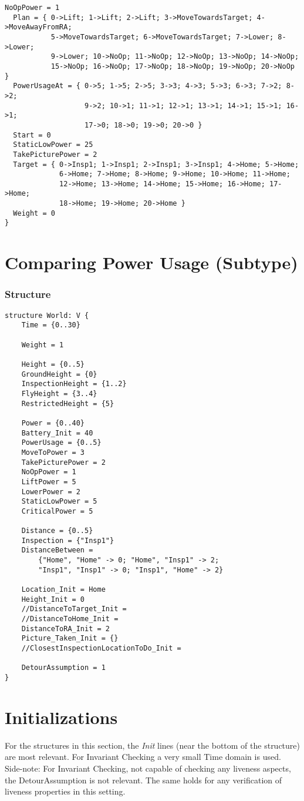 \documentclass[12pt]{extarticle}
\begin{document}
\begin{lstlisting}[basicstyle=\tiny]
  NoOpPower = 1
  Plan = { 0->Lift; 1->Lift; 2->Lift; 3->MoveTowardsTarget; 4->MoveAwayFromRA;
           5->MoveTowardsTarget; 6->MoveTowardsTarget; 7->Lower; 8->Lower;
           9->Lower; 10->NoOp; 11->NoOp; 12->NoOp; 13->NoOp; 14->NoOp;
           15->NoOp; 16->NoOp; 17->NoOp; 18->NoOp; 19->NoOp; 20->NoOp }
  PowerUsageAt = { 0->5; 1->5; 2->5; 3->3; 4->3; 5->3; 6->3; 7->2; 8->2;
                   9->2; 10->1; 11->1; 12->1; 13->1; 14->1; 15->1; 16->1;
                   17->0; 18->0; 19->0; 20->0 }
  Start = 0
  StaticLowPower = 25
  TakePicturePower = 2
  Target = { 0->Insp1; 1->Insp1; 2->Insp1; 3->Insp1; 4->Home; 5->Home;
             6->Home; 7->Home; 8->Home; 9->Home; 10->Home; 11->Home;
             12->Home; 13->Home; 14->Home; 15->Home; 16->Home; 17->Home;
             18->Home; 19->Home; 20->Home }
  Weight = 0
}
\end{lstlisting}

\section{Comparing Power Usage (Subtype)}
\label{app:powerstruct}
\subsubsection*{Structure}
\begin{lstlisting}[basicstyle=\tiny]
structure World: V {
    Time = {0..30}
    
    Weight = 1
    
    Height = {0..5}
    GroundHeight = {0}
    InspectionHeight = {1..2}
    FlyHeight = {3..4}
    RestrictedHeight = {5}
    
    Power = {0..40}
    Battery_Init = 40
    PowerUsage = {0..5}
    MoveToPower = 3
    TakePicturePower = 2
    NoOpPower = 1
    LiftPower = 5
    LowerPower = 2
    StaticLowPower = 5
    CriticalPower = 5
    
    Distance = {0..5}
    Inspection = {"Insp1"}
    DistanceBetween =
    	{"Home", "Home" -> 0; "Home", "Insp1" -> 2;
        "Insp1", "Insp1" -> 0; "Insp1", "Home" -> 2}
    
    Location_Init = Home
    Height_Init = 0
    //DistanceToTarget_Init =
    //DistanceToHome_Init =
    DistanceToRA_Init = 2
    Picture_Taken_Init = {}
    //ClosestInspectionLocationToDo_Init =
    
    DetourAssumption = 1
}
\end{lstlisting}

\section{Initializations}
\label{app:inits}
For the structures in this section, the \textit{Init} lines (near the bottom of the structure) are most relevant. For Invariant Checking a very small Time domain is used.\\
Side-note: For Invariant Checking, not capable of checking any liveness aspects, the DetourAssumption is not relevant. The same holds for any verification of liveness properties in this setting.
\end{document}
